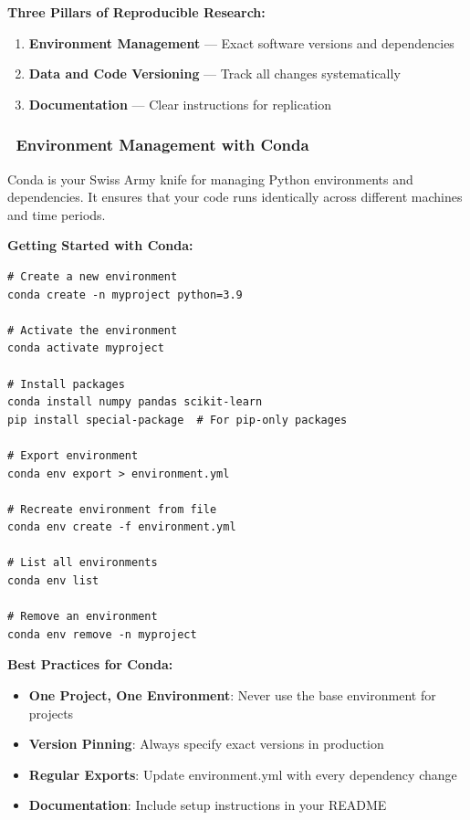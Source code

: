\documentclass[11pt,a4paper]{article}
\begin{document}
\textbf{Three Pillars of Reproducible Research:}

\begin{enumerate}
    \item \textbf{Environment Management} — Exact software versions and dependencies
    \item \textbf{Data and Code Versioning} — Track all changes systematically
    \item \textbf{Documentation} — Clear instructions for replication
\end{enumerate}

\subsubsection{\faCubes~Environment Management with Conda}

Conda is your Swiss Army knife for managing Python environments and dependencies. It ensures that your code runs identically across different machines and time periods.

\textbf{Getting Started with Conda:}

\begin{tcolorbox}[colback=green!5,colframe=green!50,title={Essential Conda Commands}]
\begin{lstlisting}[style=bashstyle]
# Create a new environment
conda create -n myproject python=3.9

# Activate the environment
conda activate myproject

# Install packages
conda install numpy pandas scikit-learn
pip install special-package  # For pip-only packages

# Export environment
conda env export > environment.yml

# Recreate environment from file
conda env create -f environment.yml

# List all environments
conda env list

# Remove an environment
conda env remove -n myproject
\end{lstlisting}
\end{tcolorbox}

\textbf{Best Practices for Conda:}
\begin{itemize}
    \item \textbf{One Project, One Environment}: Never use the base environment for projects
    \item \textbf{Version Pinning}: Always specify exact versions in production
    \item \textbf{Regular Exports}: Update environment.yml with every dependency change
    \item \textbf{Documentation}: Include setup instructions in your README
\end{itemize}
\end{document}
